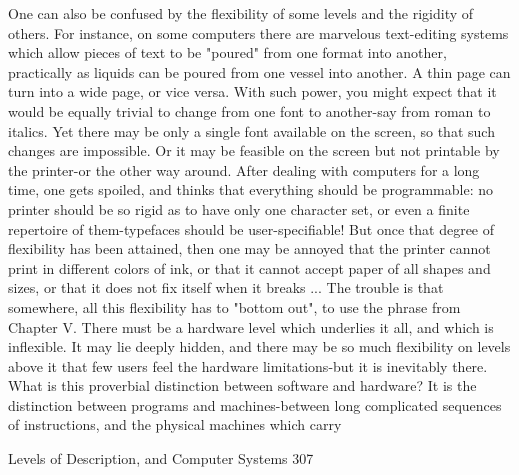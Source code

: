        One can also be confused by the flexibility of some levels and the rigidity of
       others. For instance, on some computers there are marvelous text-editing systems
       which allow pieces of text to be "poured" from one format into another,
       practically as liquids can be poured from one vessel into another. A thin page can
       turn into a wide page, or vice versa. With such power, you might expect that it
       would be equally trivial to change from one font to another-say from roman to
       italics. Yet there may be only a single font available on the screen, so that such
       changes are impossible. Or it may be feasible on the screen but not printable by
       the printer-or the other way around. After dealing with computers for a long time,
       one gets spoiled, and thinks that everything should be programmable: no printer
       should be so rigid as to have only one character set, or even a finite repertoire of
       them-typefaces should be user-specifiable! But once that degree of flexibility has
       been attained, then one may be annoyed that the printer cannot print in different
       colors of ink, or that it cannot accept paper of all shapes and sizes, or that it does
       not fix itself when it breaks ...
                The trouble is that somewhere, all this flexibility has to "bottom out", to
       use the phrase from Chapter V. There must be a hardware level which underlies it
       all, and which is inflexible. It may lie deeply hidden, and there may be so much
       flexibility on levels above it that few users feel the hardware limitations-but it is
       inevitably there.
                What is this proverbial distinction between software and hardware? It is
       the distinction between programs and machines-between long complicated
       sequences of instructions, and the physical machines which carry




Levels of Description, and Computer Systems                                              307

